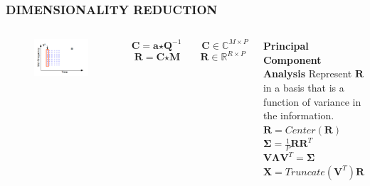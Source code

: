 \documentclass{beamer}
\begin{document}
\begin{frame}
\frametitle{DIMENSIONALITY REDUCTION}
\begin{columns}[c]
\begin{figure}
\includegraphics[width=\textwidth]{dim_1}
\end{figure}
\[
\textbf{C} = \textbf{a} \bm{\star} \textbf{Q}^{-1} \qquad \textbf{C} \in \mathbb{C}^{M \times P}
\]
\[
\textbf{R} = \textbf{C} \bm{\star} \textbf{M} \qquad \textbf{R} \in \mathbb{R}^{R \times P}
\]
\begin{block}{\textbf{Principal Component Analysis}}
Represent $\textbf{R}$ in a basis that is a function of variance in the information.\\
$\textbf{\^R} = Center(\textbf{R})$\\
$\bm{\Sigma} = \frac{1}{P}\textbf{\^R} \textbf{\^R}^{T}$\\
$\textbf{V}\bm{\Lambda}\textbf{V}^{T} = \bm{\Sigma}$\\
$\textbf{X} = Truncate(\textbf{V}^{T})\textbf{\^R}$
\end{block}
\end{columns}
\end{frame}
\end{document}

